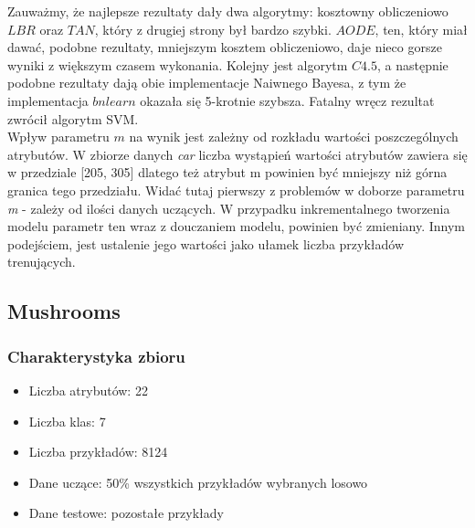 \documentclass[16]{article}
\begin{document}
Zauważmy, że najlepsze rezultaty dały dwa algorytmy: kosztowny obliczeniowo $LBR$ oraz $TAN$, który z drugiej strony był bardzo szybki. $AODE$, ten, który miał dawać, podobne rezultaty, mniejszym kosztem obliczeniowo, daje nieco gorsze wyniki z większym czasem wykonania. Kolejny jest algorytm $C4.5$, a następnie podobne rezultaty dają obie implementacje Naiwnego Bayesa, z tym że implementacja $bnlearn$ okazała się 5-krotnie szybsza. Fatalny wręcz rezultat zwrócił algorytm SVM. \\ 
Wpływ parametru $m$ na wynik jest zależny od rozkładu wartości poszczególnych atrybutów. W zbiorze danych \textit{car} liczba wystąpień wartości atrybutów zawiera się w przedziale [205, 305] dlatego też atrybut m powinien być mniejszy niż górna granica tego przedziału. Widać tutaj pierwszy z problemów w doborze parametru \textit{m} - zależy od ilości danych uczących. W przypadku inkrementalnego tworzenia modelu parametr ten wraz z douczaniem modelu, powinien być zmieniany. Innym podejściem, jest ustalenie jego wartości jako ułamek liczba przykładów trenujących.


\subsection{Mushrooms}
\subsubsection{Charakterystyka zbioru}
\begin{itemize}
  \item Liczba atrybutów: 22
	\item Liczba klas: 7
	\item Liczba przykładów: 8124
	\item Dane uczące: 50\% wszystkich przykładów wybranych losowo 
	\item Dane testowe: pozostałe przykłady
\end{itemize}
\end{document}

